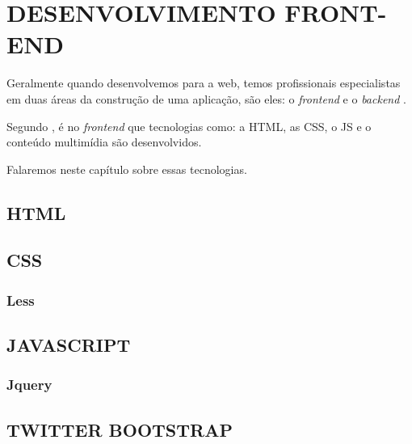 \chapter{DESENVOLVIMENTO FRONT-END}
\label{desenvolvimentoFrontEnd}

Geralmente quando desenvolvemos para a web, temos profissionais especialistas em
duas áreas da construção de uma aplicação, são eles: o \textit{frontend} e o
\textit{backend} \cite{artigoAvaliacaoEReducaoDoTempoDeRespostaDeSistemasWeb}.

Segundo , é no
\textit{frontend} que tecnologias como: a \ac{HTML}, as \ac{CSS}, o \ac{JS}
e o conteúdo multimídia são desenvolvidos.

Falaremos neste capítulo sobre essas tecnologias.

\section{HTML}
\section{CSS}
\subsection{Less}
\section{JAVASCRIPT}
\subsection{Jquery}
\section{TWITTER BOOTSTRAP}